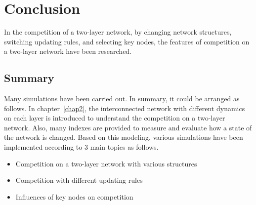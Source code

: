
\chapter{Conclusion}
\label{chap6}
In the competition of a two-layer network, by changing network structures, switching updating rules, and selecting key nodes, the features of competition on a two-layer network have been researched.\\
 
\section{Summary}
Many simulations have been carried out. In summary, it could be arranged as follows. 
In chapter~\ref{chap2}, the interconnected network with different dynamics on each layer is introduced to understand the competition on a two-layer network.  Also, many indexes are provided to measure and evaluate how a state of the network is changed. Based on this modeling, various simulations have been implemented according to 3 main topics as follows.

\begin{itemize}
\item Competition on a two-layer network with various structures
\item Competition with different updating rules
\item Influences of key nodes on competition
\end{itemize}

